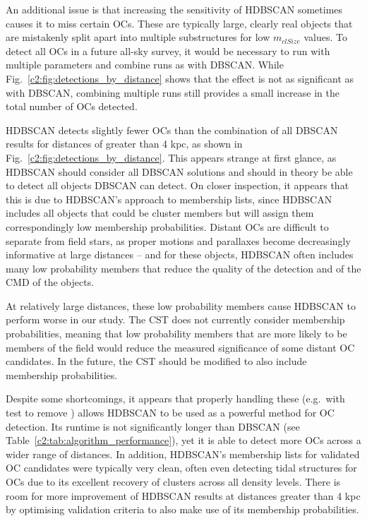 An additional issue is that increasing the sensitivity of HDBSCAN sometimes causes it to miss certain OCs. These are typically large, clearly real objects that are mistakenly split apart into multiple substructures for low $m_{clSize}$ values. To detect all OCs in a future all-sky survey, it would be necessary to run with multiple parameters and combine runs as with DBSCAN. While Fig.~\ref{c2:fig:detections_by_distance} shows that the effect is not as significant as with DBSCAN, combining multiple runs still provides a small increase in the total number of OCs detected.

HDBSCAN detects slightly fewer OCs than the combination of all DBSCAN results for distances of greater than 4 kpc, as shown in Fig.~\ref{c2:fig:detections_by_distance}. This appears strange at first glance, as HDBSCAN should consider all DBSCAN solutions and should in theory be able to detect all objects DBSCAN can detect. On closer inspection, it appears that this is due to HDBSCAN's approach to membership lists, since HDBSCAN includes all objects that could be cluster members but will assign them correspondingly low membership probabilities. Distant OCs are difficult to separate from field stars, as proper motions and parallaxes become decreasingly informative at large distances -- and for these objects, HDBSCAN often includes many low probability members that reduce the quality of the detection and of the CMD of the objects. 

At relatively large distances, these low probability members cause HDBSCAN to perform worse in our study. The CST does not currently consider membership probabilities, meaning that low probability members that are more likely to be members of the field would reduce the measured significance of some distant OC candidates. In the future, the CST should be modified to also include membership probabilities.

Despite some shortcomings, it appears that properly handling these (e.g.\ with test to remove ) allows HDBSCAN to be used as a powerful method for OC detection. Its runtime is not significantly longer than DBSCAN (see Table~\ref{c2:tab:algorithm_performance}), yet it is able to detect more OCs across a wider range of distances. In addition, HDBSCAN's membership lists for validated OC candidates were typically very clean, often even detecting tidal structures for OCs due to its excellent recovery of clusters across all density levels. There is room for more improvement of HDBSCAN results at distances greater than 4 kpc by optimising validation criteria to also make use of its membership probabilities.


